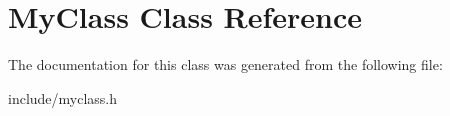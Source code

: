 \hypertarget{classMyClass}{}\section{My\+Class Class Reference}
\label{classMyClass}


The documentation for this class was generated from the following file\+:\begin{DoxyCompactItemize}
\item 
include/myclass.\+h\end{DoxyCompactItemize}
